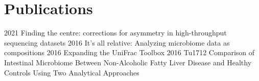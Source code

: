 \documentclass[]{twentysecondcv}
\begin{document}
\section{Publications}
\vspace{-10px}

\begin{twentyshort}
  \twentyitemshort
    {2021}
    {Finding the centre: corrections for asymmetry in high-throughput sequencing datasets}
  \twentyitemshort
    {2016}
    {It's all relative: Analyzing microbiome data as compositions}
  \twentyitemshort
    {2016}
    {Expanding the UniFrac Toolbox}
  \twentyitemshort
    {2016}
    {Tu1712 Comparison of Intestinal Microbiome Between Non-Alcoholic Fatty Liver Disease and Healthy Controls Using Two Analytical Approaches}
\end{twentyshort}

\end{document}
